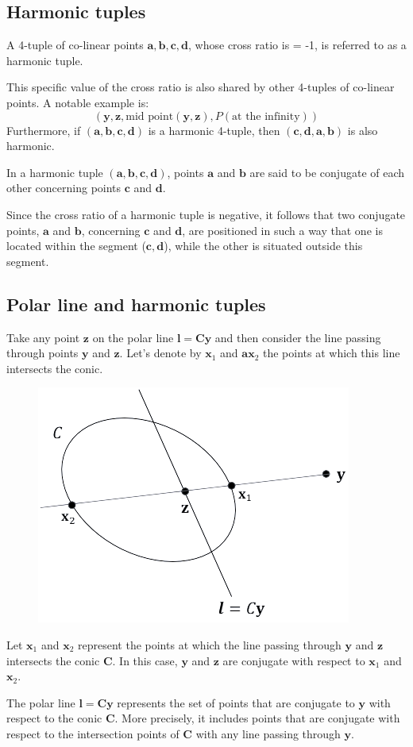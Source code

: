 \subsection{Harmonic tuples}
\begin{definition}
    A 4-tuple of co-linear points $\mathbf{a}, \mathbf{b}, \mathbf{c}, \mathbf{d}$, whose cross ratio is = -1, is referred to as a harmonic tuple. 
\end{definition}
This specific value of the cross ratio is also shared by other 4-tuples of co-linear points. 
A notable example is:
\[\left( \mathbf{y},\mathbf{z},\text{mid point}(\mathbf{y},\mathbf{z}),P(\text{at the infinity}) \right)\]
Furthermore, if $(\mathbf{a}, \mathbf{b}, \mathbf{c}, \mathbf{d})$ is a harmonic 4-tuple, then $(\mathbf{c}, \mathbf{d}, \mathbf{a}, \mathbf{b})$ is also harmonic. 
\begin{definition}
    In a harmonic tuple $(\mathbf{a}, \mathbf{b}, \mathbf{c}, \mathbf{d})$, points $\mathbf{a}$ and $\mathbf{b}$ are said to be conjugate of each other concerning points $\mathbf{c}$ and $\mathbf{d}$.
\end{definition}
Since the cross ratio of a harmonic tuple is negative, it follows that two conjugate points, $\mathbf{a}$ and $\mathbf{b}$, concerning $\mathbf{c}$ and $\mathbf{d}$, are positioned in such a way that one is located within the segment ($\mathbf{c}, \mathbf{d}$), while the other is situated outside this segment.

\subsection{Polar line and harmonic tuples}
Take any point $\mathbf{z}$ on the polar line $\mathbf{l}=\mathbf{Cy}$ and then consider the line passing through points $\mathbf{y}$ and $\mathbf{z}$. 
Let's denote by $\mathbf{x}_1$ and $\mathbf{ax}_2$ the points at which this line intersects the conic.    
\begin{figure}[H]
    \centering
    \includegraphics[width=0.25\linewidth]{images/polarharmonic.png}
\end{figure}
\begin{theorem}
    Let $\mathbf{x}_1$ and $\mathbf{x}_2$ represent the points at which the line passing through $\mathbf{y}$ and $\mathbf{z}$ intersects the conic $\mathbf{C}$. 
    In this case, $\mathbf{y}$ and $\mathbf{z}$ are conjugate with respect to $\mathbf{x}_1$ and $\mathbf{x}_2$.     
\end{theorem}
The polar line $\mathbf{l}=\mathbf{Cy}$ represents the set of points that are conjugate to $\mathbf{y}$ with respect to the conic $\mathbf{C}$.
More precisely, it includes points that are conjugate with respect to the intersection points of $\mathbf{C}$ with any line passing through $\mathbf{y}$.

